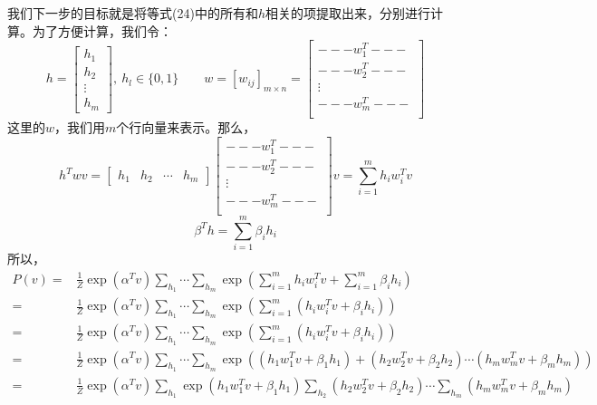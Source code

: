 \documentclass[a4paper]{article}
\begin{document}
我们下一步的目标就是将等式(24)中的所有和$h$相关的项提取出来，分别进行计算。为了方便计算，我们令：
\begin{equation}
    h = 
   \begin{bmatrix}
    h_1 \\
    h_2\\
    \vdots \\ 
    h_m
    \end{bmatrix}, \ h_l\in\{0,1\}\qquad
    w=[w_{ij}]_{m\times n} = 
    \begin{bmatrix}
    ---w_1^{T}---\\
    ---w_2^{T}---\\
    \vdots \\
    ---w_m^{T}---\\
    \end{bmatrix}
\end{equation}
这里的$w$，我们用$m$个行向量来表示。那么，
$$
h^T w v = \begin{bmatrix}
    h_1 & h_2 & \cdots & h_m
    \end{bmatrix}
    \begin{bmatrix}
    ---w_1^{T}---\\
    ---w_2^{T}---\\
    \vdots \\
    ---w_m^{T}---\\
    \end{bmatrix}v = \sum_{i=1}^m h_iw_i^{T}v
$$
$$
\beta^Th = \sum_{i=1}^m \beta_i h_i
$$
所以，
\begin{equation}
    \begin{split}
        P(v) = & \frac{1}{Z} \exp(\alpha^T v) \sum_{h_1}\cdots \sum_{h_m} \exp \left(\sum_{i=1}^m h_iw_i^{T}v + \sum_{i=1}^m \beta_i h_i\right)\\
        = & \frac{1}{Z} \exp(\alpha^T v) \sum_{h_1}\cdots \sum_{h_m} \exp \left(\sum_{i=1}^m (h_iw_i^{T}v + \beta_i h_i)\right)\\
        = & \frac{1}{Z} \exp(\alpha^T v) \sum_{h_1}\cdots \sum_{h_m} \exp \left(\sum_{i=1}^m (h_iw_i^{T}v + \beta_i h_i)\right)\\
        = & \frac{1}{Z} \exp(\alpha^T v) \sum_{h_1}\cdots \sum_{h_m} \exp \left((h_1w_1^{T}v + \beta_1 h_1)+(h_2w_2^{T}v + \beta_2 h_2)\cdots (h_mw_m^{T}v + \beta_m h_m)\right)\\
        = & \frac{1}{Z} \exp(\alpha^T v) \sum_{h_1}\exp (h_1w_1^{T}v + \beta_1 h_1) \sum_{h_2}(h_2w_2^{T}v + \beta_2 h_2) \cdots \sum_{h_m}(h_mw_m^{T}v + \beta_m h_m)
    \end{split}
\end{equation}
\end{document}
